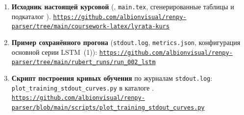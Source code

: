 \begin{enumerate}[label=\textbf{\arabic*.},wide=0pt,leftmargin=*]
\item\label{appa:elem7}\hypertarget{appa-i-7}{}\textbf{Исходник настоящей курсовой} (, \texttt{main.tex}, сгенерированные таблицы и подкаталог ). \href{https://github.com/albionvisual/renpy-parser/tree/main/coursework-latex/lyrata-kurs}{\nolinkurl{https://github.com/albionvisual/renpy-parser/tree/main/coursework-latex/lyrata-kurs}}

\item\label{appa:elem8}\hypertarget{appa-i-8}{}\textbf{Пример сохранённого прогона}  (\texttt{stdout.log}, \texttt{metrics.json}, конфигурация основной серии LSTM~(1)): \href{https://github.com/albionvisual/renpy-parser/tree/main/rubert_runs/run_002_lstm}{\nolinkurl{https://github.com/albionvisual/renpy-parser/tree/main/rubert_runs/run_002_lstm}}

\item\label{appa:elem9}\hypertarget{appa-i-9}{}\textbf{Скрипт построения кривых обучения} по журналам \texttt{stdout.log}: \texttt{plot\_training\_stdout\_curves.py} в каталоге . \href{https://github.com/albionvisual/renpy-parser/blob/main/scripts/plot_training_stdout_curves.py}{\nolinkurl{https://github.com/albionvisual/renpy-parser/blob/main/scripts/plot_training_stdout_curves.py}}
\end{enumerate}
